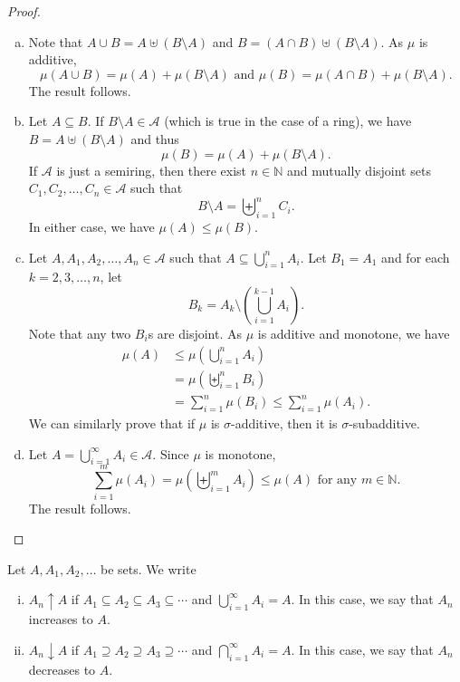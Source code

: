 \begin{proof}
~
    \begin{enumerate}[(a)]
        \item Note that $A\cup B=A\uplus (B\setminus A)$ and $B=(A\cap B)\uplus (B\setminus A)$. As $\mu$ is additive,
        $$\mu(A\cup B)=\mu(A)+\mu(B\setminus A)\text{ and }\mu(B)=\mu(A\cap B)+\mu(B\setminus A).$$
        The result follows.
        
        \item Let $A\subseteq B$. If $B\setminus A\in\mathcal{A}$ (which is true in the case of a ring), we have $B=A\uplus (B\setminus A)$ and thus
        $$\mu(B)=\mu(A)+\mu(B\setminus A).$$
        If $\mathcal{A}$ is just a semiring, then there exist $n\in\mathbb{N}$ and mutually disjoint sets $C_1,C_2,\ldots,C_n\in\mathcal{A}$ such that $$B\setminus A=\biguplus_{i=1}^n C_i.$$
        In either case, we have $\mu(A)\leq \mu(B)$.
        
        \item Let $A, A_1,A_2,\ldots,A_n\in\mathcal{A}$ such that $A\subseteq\bigcup_{i=1}^n A_i$. Let $B_1=A_1$ and for each $k=2,3,\ldots,n$, let
        $$B_k = A_k\setminus\left(\bigcup_{i=1}^{k-1}A_i\right).$$
        Note that any two $B_i$s are disjoint. As $\mu$ is additive and monotone, we have
        \begin{align*}
            \mu(A) &\leq \mu\left(\bigcup_{i=1}^n A_i\right) \\
            &= \mu\left(\biguplus_{i=1}^n B_i\right) \\
            &= \sum_{i=1}^n \mu(B_i) \leq \sum_{i=1}^n \mu(A_i).
        \end{align*}
        We can similarly prove that if $\mu$ is $\sigma$-additive, then it is $\sigma$-subadditive.
        
        \item Let $A=\bigcup_{i=1}^\infty A_i\in\mathcal{A}$. Since $\mu$ is monotone,
        $$\sum_{i=1}^m\mu(A_i)=\mu\left(\biguplus_{i=1}^m A_i\right)\leq \mu(A)\text{ for any $m\in\mathbb{N}$.}$$
        The result follows.
    \end{enumerate}
\end{proof}

\begin{definition}
    Let $A,A_1,A_2,\ldots$ be sets. We write
    \begin{enumerate}[(i)]
        \item $A_n\uparrow A$ if $A_1\subseteq A_2\subseteq A_3\subseteq\cdots$ and $\bigcup_{i=1}^\infty A_i=A$. In this case, we say that $A_n$ increases to $A$.
        \item $A_n\downarrow A$ if $A_1\supseteq A_2\supseteq A_3\supseteq\cdots$ and $\bigcap_{i=1}^\infty A_i=A$. In this case, we say that $A_n$ decreases to $A$.
    \end{enumerate}
\end{definition}

